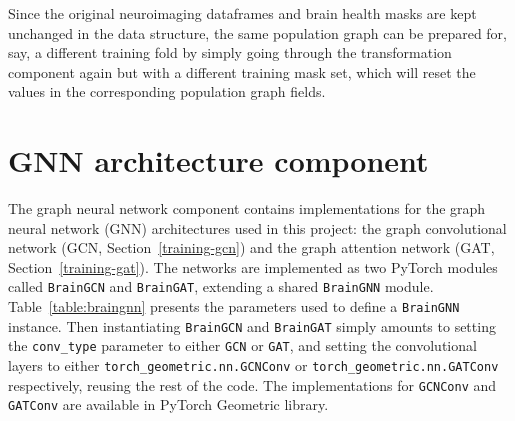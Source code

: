 Since the original neuroimaging dataframes and brain health masks are kept unchanged in the data structure, the same population graph can be prepared for, say, a different training fold by simply going through the transformation component again but with a different training mask set, which will reset the values in the corresponding population graph fields.

\section{GNN architecture component}
\label{section:gnn-architecture}

The graph neural network component contains implementations for the graph neural network (GNN) architectures used in this project: the graph convolutional network (GCN, Section~\ref{training-gcn}) and the graph attention network (GAT, Section~\ref{training-gat}). The networks are implemented as two PyTorch modules called \texttt{BrainGCN} and \texttt{BrainGAT}, extending a shared \texttt{BrainGNN} module. Table~\ref{table:braingnn} presents the parameters used to define a \texttt{BrainGNN} instance. Then instantiating \texttt{BrainGCN} and \texttt{BrainGAT} simply amounts to setting the \texttt{conv\_type} parameter to either \texttt{GCN} or \texttt{GAT}, and setting the convolutional layers to either \texttt{torch\_geometric.nn.GCNConv} or \texttt{torch\_geometric.nn.GATConv} respectively, reusing the rest of the code. The implementations for \texttt{GCNConv} and \texttt{GATConv} are available in PyTorch Geometric library.


